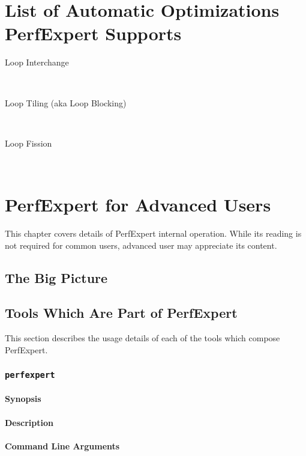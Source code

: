 \chapter{List of Automatic Optimizations PerfExpert Supports}

\begin{description}
	\item[Loop Interchange]\hfill \\
	\item[Loop Tiling (aka Loop Blocking)]\hfill \\
	\item[Loop Fission]\hfill \\

\end{description}

\chapter{PerfExpert for Advanced Users}

This chapter covers details of PerfExpert internal operation. While its reading is not required for common users, advanced user may appreciate its content.

\section{The Big Picture}

\section{Tools Which Are Part of PerfExpert}

This section describes the usage details of each of the tools which compose PerfExpert.

\subsection{\texttt{perfexpert}}

\subsubsection{Synopsis}

\subsubsection{Description}

\subsubsection{Command Line Arguments}

